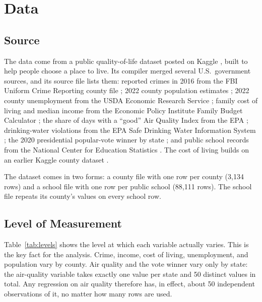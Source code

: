 \documentclass[12pt,letterpaper]{report}
\begin{document}
\chapter{Data}\label{ch:data}

\section{Source}
The data come from a public quality-of-life dataset posted on Kaggle \cite{vaughan}, built
to help people
choose a place to live. Its compiler merged several U.S.\ government sources, and its source
file lists them: reported crimes in 2016 from the FBI Uniform Crime Reporting county file
\cite{icpsr37059}; 2022 county population estimates \cite{census2022}; 2022 county
unemployment from the USDA Economic Research Service \cite{ers2022}; family cost of living
and median income from the Economic Policy Institute Family Budget Calculator
\cite{epi2024}; the share of days with a ``good'' Air Quality Index from the EPA
\cite{epaaqi}; drinking-water violations from the EPA Safe Drinking Water Information System
\cite{sdwis}; the 2020 presidential popular-vote winner by state \cite{app2020}; and public
school records from the National Center for Education Statistics \cite{nces2022}. The cost
of living builds on an earlier Kaggle county dataset \cite{asaniczka}.

The dataset comes in two forms: a county file with one row per county (3,134 rows) and a
school file with one row per public school (88,111 rows). The school file repeats its
county's values on every school row.

\section{Level of Measurement}
Table~\ref{tab:levels} shows the level at which each variable actually varies. This is the
key fact for the analysis. Crime, income, cost of living, unemployment, and population vary
by county. Air quality and the vote winner vary only by state: the air-quality variable takes
exactly one value per state and 50 distinct values in total. Any regression on air quality
therefore has, in effect, about 50 independent observations of it, no matter how many rows
are used.
\end{document}
